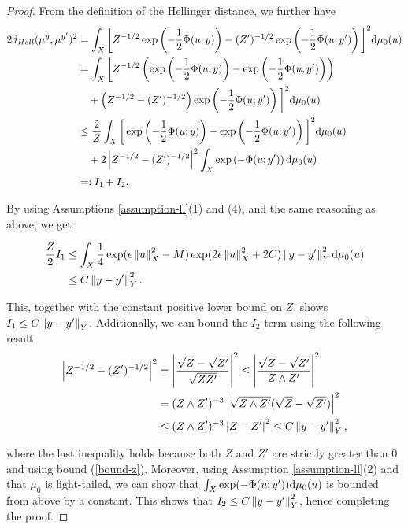 \begin{proof}
  From the definition of the Hellinger distance, we further have
  \begin{align*}
    2d_{Hell}(\mu^y, \mu^{y'})^2
    &= \int_X\bigg[Z^{-1/2}\exp\left(-\frac12\Phi(u;y)\right) - (Z')^{-1/2}\exp\left(-\frac12\Phi(u; y')\right)\bigg]^2\text{d}\mu_0(u)\\
    &=\int_X\bigg[Z^{-1/2}\left(\exp\left(-\frac12\Phi(u;y)\right) - \exp\left(-\frac12\Phi(u; y')\right)\right)\\
    &\ \ \  + \left(Z^{-1/2}- (Z')^{-1/2}\right)\exp\left(-\frac12\Phi(u; y')\right)\bigg]^2\text{d}\mu_0(u)\\
    &\le \frac2Z\int_X\bigg[\exp\left(-\frac12\Phi(u;y)\right) - \exp\left(-\frac12\Phi(u; y')\right)\bigg]^2\text{d}\mu_0(u)\\
    &\ \ \ + 2\left|Z^{-1/2} - (Z')^{-1/2}\right|^2\int_X\exp\left(-\Phi(u; y')\right)\text{d}\mu_0(u)\\
    &=: I_1 + I_2.
  \end{align*}
  
  By using Assumptions \ref{assumption-ll}(1) and (4), and the same reasoning as above, we get

  \begin{equation*}
    \begin{aligned}
      \frac{Z}2I_1 &\le \int_X\frac14\exp(\epsilon\left\lVert u\right\rVert_X^2 - M)\exp(2\epsilon\left\lVert u\right\rVert_X^2 + 2C)\left\lVert y - y'\right\rVert_Y^2 \text{d}\mu_0(u)\\
        & \le C\left\lVert y - y'\right\rVert_Y^2.
    \end{aligned}
  \end{equation*}

  This, together with the constant positive lower bound on $Z$, shows $I_1 \le C\left\lVert y - y'\right\rVert_Y$. Additionally, we can bound the $I_2$ term using the following result
  \begin{align*}
    \left|Z^{-1/2} - (Z')^{-1/2}\right|^2
    &= \left|\frac{\sqrt{Z} - \sqrt{Z'}}{\sqrt{ZZ'}}\right|^2 \leq \left|\frac{\sqrt{Z} - \sqrt{Z'}}{Z \land Z'}\right|^2 \\
    &= (Z \land Z')^{-3}\left|\sqrt{Z \land Z'}(\sqrt{Z} - \sqrt{Z'})\right|^2\\
    &\le (Z \land Z')^{-3}\left|Z - Z'\right|^2 \le C\left\lVert y - y'\right\rVert_Y^2,
  \end{align*}

  where the last inequality holds because both $Z$ and $Z'$ are strictly greater than $0$ and using bound (\ref{bound-z}). Moreover, using Assumption \ref{assumption-ll}(2) and that $\mu_0$ is light-tailed, we can show that $\int_X\exp(-\Phi(u; y'))\text{d}\mu_0(u)$ is bounded from above by a constant. This shows that $I_2 \le C\left\lVert y - y'\right\rVert_Y^2$, hence completing the proof.
\end{proof}

